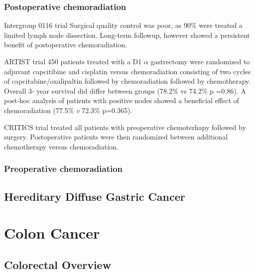 \documentclass[
]{book}
\begin{document}
\hypertarget{postoperative-chemoradiation-1}{%
\section{Postoperative chemoradiation}\label{postoperative-chemoradiation-1}}

Intergroup 0116 trial \citep{macdonald725}
Surgical quality control was poor, as 90\% were treated a limited lymph node dissection. Long-term followup, however \citep{smalley2327} showed a persistent benefit of postoperative chemoradiation.

ARTIST trial 450 patients treated with a D1 \(\alpha\) gastrectomy were randomized to adjuvant capcitibine and cisplatin versus chemoradiation consisting of two cycles of capcitabine/oxalipaltin followed by chemoradiation followed by chemotherapy. Overall 3- year survival did differ between groups (78.2\% vs 74.2\% p =0.86). A post-hoc analysis of patients with positive nodes showed a beneficial effect of chemoradiation (77.5\% \emph{v} 72.3\% p=0.365).\citep{lee268}

CRITICS trial treated all patients with preoperative chemoterhapy followed by surgery. Postoperative patients were then randomized between additional chemotherapy versus chemoradiation.

\hypertarget{preoperative-chemoradiation}{%
\section{Preoperative chemoradiation}\label{preoperative-chemoradiation}}

\citep{ajani3953}

\hypertarget{hereditary-diffuse-gastric-cancer}{%
\chapter{Hereditary Diffuse Gastric Cancer}\label{hereditary-diffuse-gastric-cancer}}

\hypertarget{part-colon-cancer}{%
\part*{Colon Cancer}\label{part-colon-cancer}}

\hypertarget{colorectal-overview}{%
\chapter{Colorectal Overview}\label{colorectal-overview}}
\end{document}
